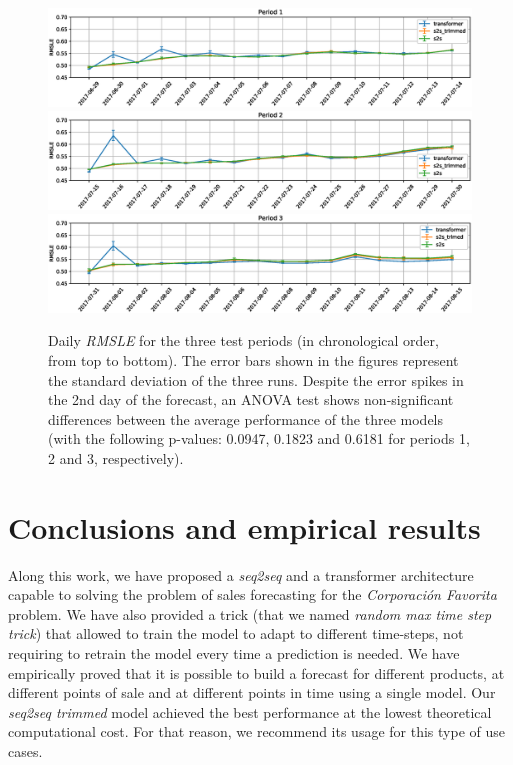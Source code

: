 \documentclass{elsarticle}
\begin{document}
\begin{figure}
	\centering
	\includegraphics[width=1\linewidth]{img/lag3_daily_error}
	\includegraphics[width=1\linewidth]{img/lag2_daily_error}
	\includegraphics[width=1\linewidth]{img/lag1_daily_error}
	\caption{Daily \textit{RMSLE} for the three test periods (in chronological order, from top to bottom). The error bars shown in the figures represent the standard deviation of the three runs. Despite the error spikes in the 2nd day of the forecast, an ANOVA test shows non-significant differences between the average performance of the three models (with the following p-values: 0.0947, 0.1823 and 0.6181 for periods 1, 2 and 3, respectively). }
	\label{fig:dailyerror}
\end{figure}



	\section{Conclusions and empirical results} \label{sec:conclusions}
	
	Along this work, we have proposed a \textit{seq2seq} and a transformer architecture capable to solving the problem of sales forecasting for the \textit{Corporación Favorita} problem. We have also provided a trick (that we named \textit{random max time step trick}) that allowed to train the model to adapt to different time-steps, not requiring to retrain the model every time a prediction is needed. We have empirically proved that it is possible to build a forecast for different products, at different points of sale and at different points in time using a single model. Our \textit{seq2seq trimmed} model achieved the best performance at the lowest theoretical computational cost. For that reason, we recommend its usage for this type of use cases.
\end{document}
